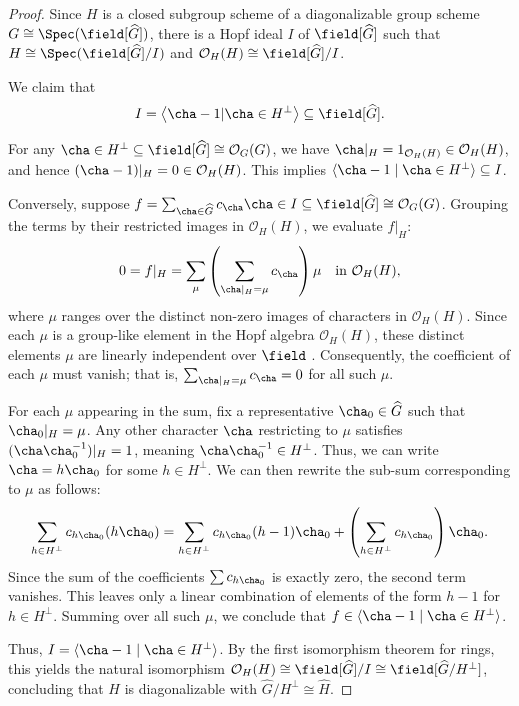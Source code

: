 \begin{proof}
Since $H$ is a closed subgroup scheme of
a diagonalizable group scheme
$G\cong \Spec(\field[\widehat{G}])$,
there is a Hopf ideal $I$ of $\field[\widehat{G}]$
such that
$H\cong\Spec(\field[\widehat{G}]/I)$
and
$\mathcal{O}_H(H)\cong\field[\widehat{G}]/I$.

We claim that
$$
I=\left<\cha-1|\cha\in H^\perp\right>
\subseteq
\field[\widehat{G}].
$$

For any
$\cha \in H^\perp\subseteq\field[\widehat{G}]\cong\mathcal{O}_G(G)$,
we have
$\cha|_H=1_{\mathcal{O}_H(H)}\in\mathcal{O}_H(H)$,
and hence
$(\cha-1)|_H=0\in \mathcal{O}_H(H)$.
This implies
$\langle \cha - 1 \mid \cha \in H^\perp \rangle \subseteq I$.

Conversely,
suppose
$f = \sum_{\cha \in \widehat{G}} c_{\cha} \cha \in I\subseteq\field[\widehat{G}]\cong\mathcal{O}_G(G)$.
Grouping the terms by their restricted images in $\mathcal{O}_H(H)$, we evaluate $f|_H$:
$$
0 = f|_H = \sum_{\mu} \left( \sum_{\cha|_H = \mu} c_{\cha} \right) \mu \quad \text{in } \mathcal{O}_H(H),
$$
where $\mu$ ranges over the distinct non-zero images of characters in $\mathcal{O}_H(H)$. Since each $\mu$ is a group-like element in the Hopf algebra $\mathcal{O}_H(H)$, these distinct elements $\mu$ are linearly independent over $\field$
\cite[\S2.2]{Waterhouse}.
Consequently, the coefficient of each $\mu$ must vanish; that is, $\sum_{\cha|_H = \mu} c_{\cha} = 0$ for all such $\mu$. 

For each $\mu$ appearing in the sum, fix a representative $\cha_0 \in \widehat{G}$ such that $\cha_0|_H = \mu$. Any other character $\cha$ restricting to $\mu$ satisfies $(\cha \cha_0^{-1})|_H = 1$, meaning $\cha \cha_0^{-1} \in H^\perp$. Thus, we can write $\cha = h\cha_0$ for some $h \in H^\perp$. We can then rewrite the sub-sum corresponding to $\mu$ as follows:
$$
\sum_{h \in H^\perp} c_{h\cha_0} (h\cha_0) = \sum_{h \in H^\perp} c_{h\cha_0} (h - 1)\cha_0 + \left( \sum_{h \in H^\perp} c_{h\cha_0} \right) \cha_0.
$$
Since the sum of the coefficients $\sum c_{h\cha_0}$ is exactly zero, the second term vanishes. This leaves only a linear combination of elements of the form $h-1$ for $h \in H^\perp$. Summing over all such $\mu$, we conclude that $f \in \langle \cha - 1 \mid \cha \in H^\perp \rangle$.

Thus, $I = \langle \cha - 1 \mid \cha \in H^\perp \rangle$. By the first isomorphism theorem for rings, this yields the natural isomorphism $\mathcal{O}_H(H) \cong \field[\widehat{G}]/I \cong \field[\widehat{G}/H^\perp]$,
concluding that $H$ is diagonalizable
with
$\widehat{G}/H^\perp\cong\widehat{H}$.
\end{proof}

